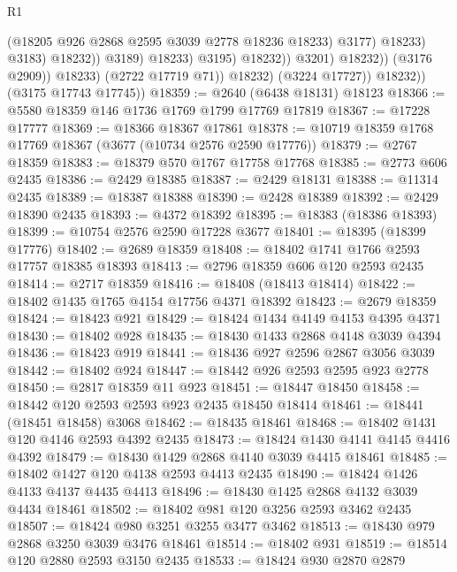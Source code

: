 \begin{lexlean}{R1}
\begin{coremodule}
                                              (@18205 @926 @2868 @2595 @3039 @2778 @18236 @18233)
                                              @3177)
                                            @18233)
                                          @3183)
                                        @18232))
                                    @3189)
                                  @18233)
                                @3195)
                              @18232))
                          @3201)
                        @18232))
                    (@3176 @2909))
                  @18233)
                (@2722 @17719 @71))
              @18232)
            (@3224 @17727))
          @18232))
      (@3175 @17743 @17745))
@18359 := @2640 (@6438 @18131) @18123
@18366 := @5580 @18359 @146 @1736 @1769 @1799 @17769 @17819
@18367 := @17228 @17777
@18369 := @18366 @18367 @17861
@18378 := @10719 @18359 @1768 @17769 @18367 (@3677 (@10734 @2576 @2590 @17776))
@18379 := @2767 @18359
@18383 := @18379 @570 @1767 @17758 @17768
@18385 := @2773 @606 @2435
@18386 := @2429 @18385
@18387 := @2429 @18131
@18388 := @11314 @2435
@18389 := @18387 @18388
@18390 := @2428 @18389
@18392 := @2429 @18390 @2435
@18393 := @4372 @18392
@18395 := @18383 (@18386 @18393)
@18399 := @10754 @2576 @2590 @17228 @3677
@18401 := @18395 (@18399 @17776)
@18402 := @2689 @18359
@18408 := @18402 @1741 @1766 @2593 @17757 @18385 @18393
@18413 := @2796 @18359 @606 @120 @2593 @2435
@18414 := @2717 @18359
@18416 := @18408 (@18413 @18414)
@18422 := @18402 @1435 @1765 @4154 @17756 @4371 @18392
@18423 := @2679 @18359
@18424 := @18423 @921
@18429 := @18424 @1434 @4149 @4153 @4395 @4371
@18430 := @18402 @928
@18435 := @18430 @1433 @2868 @4148 @3039 @4394
@18436 := @18423 @919
@18441 := @18436 @927 @2596 @2867 @3056 @3039
@18442 := @18402 @924
@18447 := @18442 @926 @2593 @2595 @923 @2778
@18450 := @2817 @18359 @11 @923
@18451 := @18447 @18450
@18458 := @18442 @120 @2593 @2593 @923 @2435 @18450 @18414
@18461 := @18441 (@18451 @18458) @3068
@18462 := @18435 @18461
@18468 := @18402 @1431 @120 @4146 @2593 @4392 @2435
@18473 := @18424 @1430 @4141 @4145 @4416 @4392
@18479 := @18430 @1429 @2868 @4140 @3039 @4415 @18461
@18485 := @18402 @1427 @120 @4138 @2593 @4413 @2435
@18490 := @18424 @1426 @4133 @4137 @4435 @4413
@18496 := @18430 @1425 @2868 @4132 @3039 @4434 @18461
@18502 := @18402 @981 @120 @3256 @2593 @3462 @2435
@18507 := @18424 @980 @3251 @3255 @3477 @3462
@18513 := @18430 @979 @2868 @3250 @3039 @3476 @18461
@18514 := @18402 @931
@18519 := @18514 @120 @2880 @2593 @3150 @2435
@18533 := @18424
    @930
    @2870
    @2879

\end{coremodule}
\end{lexlean}
